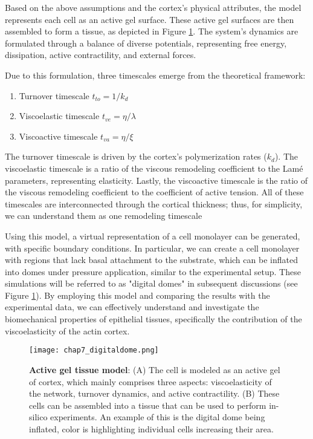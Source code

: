 Based on the above assumptions and the cortex’s physical attributes, the model represents each cell as an active gel surface. These active gel surfaces are then assembled to form a tissue, as depicted in Figure \ref{fig_7_2}. The system’s dynamics are formulated through a balance of diverse potentials, representing free energy, dissipation, active contractility, and external forces.

Due to this formulation, three timescales emerge from the theoretical framework: 

\begin{enumerate}
	\item Turnover timescale \(t_{to} = 1/k_{d}\)
	\item Viscoelastic timescale \(t_{ve} = \eta/\lambda\)
	\item Viscoactive timescale \(t_{va} = \eta/\xi\)
\end{enumerate}

The turnover timescale is driven by the cortex's polymerization rates (\(k_{d}\)). The viscoelastic timescale is a ratio of the viscous remodeling coefficient to the Lamé parameters, representing elasticity. Lastly, the viscoactive timescale is the ratio of the viscous remodeling coefficient to the coefficient of active tension. All of these timescales are interconnected through the cortical thickness; thus, for simplicity, we can understand them as one remodeling timescale

Using this model, a virtual representation of a cell monolayer can be generated, with specific boundary conditions. In particular, we can create a cell monolayer with regions that lack basal attachment to the substrate, which can be inflated into domes under pressure application, similar to the experimental setup. These simulations will be referred to as "digital domes" in subsequent discussions  (see Figure \ref{fig_7_2}). By employing this model and comparing the results with the experimental data, we can effectively understand and investigate the biomechanical properties of epithelial tissues, specifically the contribution of the viscoelasticity of the actin cortex.

\begin{figure}[]
	\centering
	\texttt{[image: chap7\_digitaldome.png]}
	\caption{\label{fig_7_2} \textbf{Active gel tissue model}: (A) The cell is modeled as an active gel of cortex, which mainly comprises three aspects: viscoelasticity of the network, turnover dynamics, and active contractility. (B) These cells can be assembled into a tissue that can be used to perform in-silico experiments. An example of this is the digital dome being inflated, color is highlighting individual cells increasing their area.}
\end{figure}

